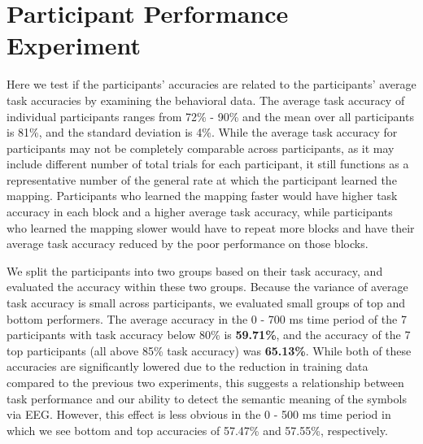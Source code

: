 \section{Participant Performance Experiment}

Here we test if the participants' \tvt accuracies are related to the 
participants' average task accuracies by examining the behavioral data. The 
average task accuracy of individual participants ranges from 72\% - 90\% and 
the mean over all participants is 81\%, and the standard deviation is 4\%.  
While the average task accuracy for participants may not be completely 
comparable across participants, as it may include different number of total 
trials for each participant, it still functions as a representative number of 
the general rate at which the participant learned the mapping. Participants who 
learned the mapping faster would have higher task accuracy in each block and a 
higher average task accuracy, while participants who learned the mapping slower 
would have to repeat more blocks and have their average task accuracy reduced 
by the poor performance on those blocks.

We split the participants into two groups based on their task accuracy, and 
evaluated the \tvt accuracy within these two groups. Because the variance of 
average task accuracy is small across participants, we evaluated small groups 
of top and bottom performers. The average \tvt accuracy in the 0 - 700 ms time 
period of the 7 participants with task accuracy below 80\% is {\bf 59.71\%}, 
and the \tvt accuracy of the 7 top participants (all above 85\% task accuracy) 
was {\bf 65.13\%}. While both of these \tvt accuracies are significantly 
lowered due to the reduction in training data compared to the previous two 
experiments, this suggests a relationship between task performance and our 
ability to detect the semantic meaning of the symbols via EEG. However, this 
effect is less obvious in the 0 - 500 ms time period in which we see bottom and 
top accuracies of 57.47\% and 57.55\%, respectively.
